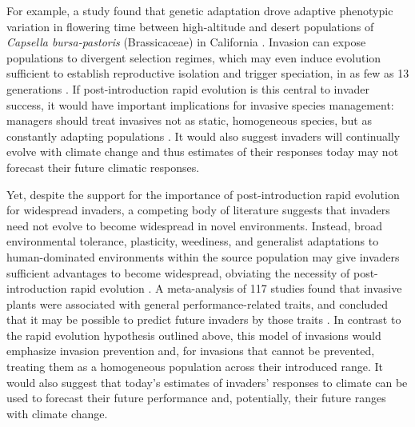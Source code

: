 \documentclass[11pt]{article}\usepackage[]{graphicx}\usepackage[]{color}
\begin{document}
    For example, a study found that genetic adaptation drove adaptive phenotypic variation in flowering time between high-altitude and desert populations of \textit{Capsella bursa-pastoris} (Brassicaceae) in California \parencite{Linde2001}. Invasion can expose populations to divergent selection regimes, which may even induce evolution sufficient to establish reproductive isolation and trigger speciation, in as few as 13 generations \parencite{Hendry2000}. If post-introduction rapid evolution is this central to invader success, it would have important implications for invasive species management: managers should treat invasives not as static, homogeneous species, but as constantly adapting populations \parencite{Lee2002invasion}. It would also suggest invaders will continually evolve with climate change and thus estimates of their responses today may not forecast their future climatic responses. 
	
	Yet, despite the support for the importance of post-introduction rapid evolution for widespread invaders, a competing body of literature suggests that invaders need not evolve to become widespread in novel environments. Instead, broad environmental tolerance, plasticity, weediness, and generalist adaptations to human-dominated environments within the source population may give invaders sufficient advantages to become widespread, obviating the necessity of post-introduction rapid evolution  \parencite{Richards2006,Schwartz1994,Bock2015,Rejmanek1996,Baker1965}. A meta-analysis of 117 studies found that invasive plants were associated with general performance-related traits, and concluded that it may be possible to predict future invaders by those traits \parencite{VanKleunen2010}. %
	In contrast to the rapid evolution hypothesis outlined above, this model of invasions would emphasize invasion prevention and, for invasions that cannot be prevented, treating them as a homogeneous population across their introduced range. It would also suggest that today's estimates of invaders' responses to climate can be used to forecast their future performance and, potentially, their future ranges with climate change. 
	
\end{document}
